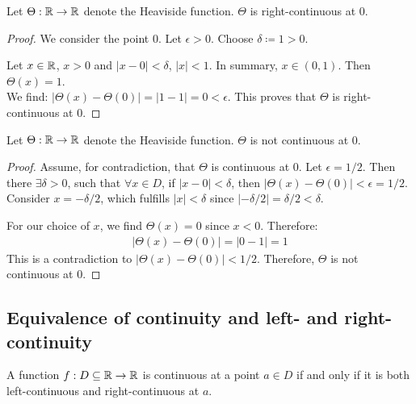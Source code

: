 \begin{theorem}
    Let $\Theta: \mathbb{R} \to \mathbb{R}$ denote the Heaviside function. $\Theta$ is right-continuous at $0$.
\end{theorem}

\begin{proof}
    We consider the point $0$. Let $\epsilon > 0$. Choose $\delta \coloneqq 1 > 0$.

    Let $x \in \mathbb{R}$, $x > 0$ and $|x - 0| < \delta$, \ie $|x| < 1$. In summary, $x\in (0,1)$. Then $\Theta(x) = 1$.\\
    We find: $|\Theta(x) - \Theta(0)| = |1 - 1| = 0 < \epsilon$. This proves that $\Theta$ is right-continuous at $0$.
\end{proof}


\begin{theorem}
    Let $\Theta: \mathbb{R} \to \mathbb{R}$ denote the Heaviside function. $\Theta$ is not continuous at $0$.
\end{theorem}

\begin{proof}
    Assume, for contradiction, that $\Theta$ is continuous at 0. Let $\epsilon = 1/2$. Then there $\exists \delta > 0$, such that $\forall x \in D$, if $|x - 0| < \delta$, then $|\Theta(x) - \Theta(0)| < \epsilon = 1/2$. Consider $\displaystyle x = -\delta/2$, which fulfills $|x| < \delta$ since $|- \delta / 2| = \delta / 2 < \delta$.

    For our choice of $x$, we find $\Theta(x) = 0$ since $x < 0$.
    Therefore:
    \begin{align*}
        |\Theta(x) - \Theta(0)| = |0 - 1| = 1
    \end{align*}
    This is a contradiction to $|\Theta(x) - \Theta(0)| < 1/2$. Therefore, $\Theta$ is not continuous at $0$.
\end{proof}




\pagebreak
\subsection{Equivalence of continuity and left- and right-continuity}

\begin{theorem}
    A function $f : D \subseteq \mathbb{R} \to \mathbb{R}$ is continuous at a point $a \in D$ if and only if it is both left-continuous and right-continuous at $a$.
\end{theorem}

